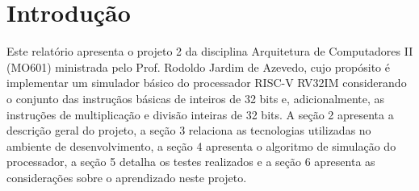 \section{Introdução}

Este relatório apresenta o projeto 2 da disciplina Arquitetura de Computadores II (MO601) \space ministrada pelo Prof. Rodoldo Jardim de Azevedo, cujo propósito é implementar um simulador básico do processador RISC-V RV32IM considerando o conjunto das instruçãos básicas de inteiros de 32 bits e, adicionalmente, as instruções de multiplicação e divisão inteiras de 32 bits. A seção 2 apresenta a descrição geral do projeto, a seção 3 relaciona as tecnologias utilizadas no ambiente de desenvolvimento, a seção 4 apresenta o algoritmo de simulação do processador, a seção 5 detalha os testes realizados e a seção 6 apresenta as considerações sobre o aprendizado neste projeto. 